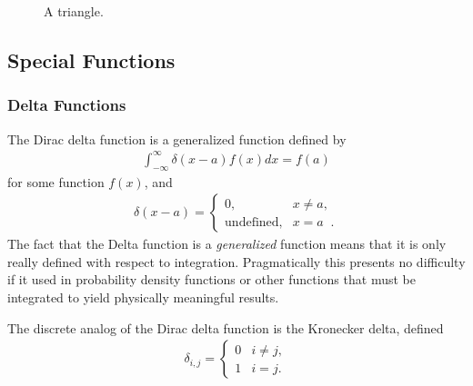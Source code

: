 \documentclass[11pt]{article}
\begin{document}
\begin{figure}
\centering
{}
\caption{A triangle.}
\label{fig::triangle}
\end{figure}
\subsection{Special Functions}
\label{sec:orgheadline51}
\subsubsection{Delta Functions}
\label{sec:orgheadline49}
The Dirac delta function is a generalized function defined by
\begin{align}
  \int_{-\infty}^\infty \delta(x-a) f(x) dx = f(a)
\end{align}
for some function \(f(x)\), and
\begin{align}
  \delta(x-a) = 
  \begin{cases}
    0, & x\neq a, \\
    \text{undefined}, & x=a \;\;.
  \end{cases}
\end{align}
The fact that the Delta function is a \emph{generalized} function means that it is only really defined with respect to integration.  Pragmatically this presents no difficulty if it used in probability density functions or other functions that must be integrated to yield physically meaningful results.

The discrete analog of the Dirac delta function is the Kronecker delta, defined
\begin{align}
  \delta_{i,j} = 
  \begin{cases}
    0 & i \neq j, \\
    1 & i = j.
  \end{cases}
\end{align}
\end{document}

